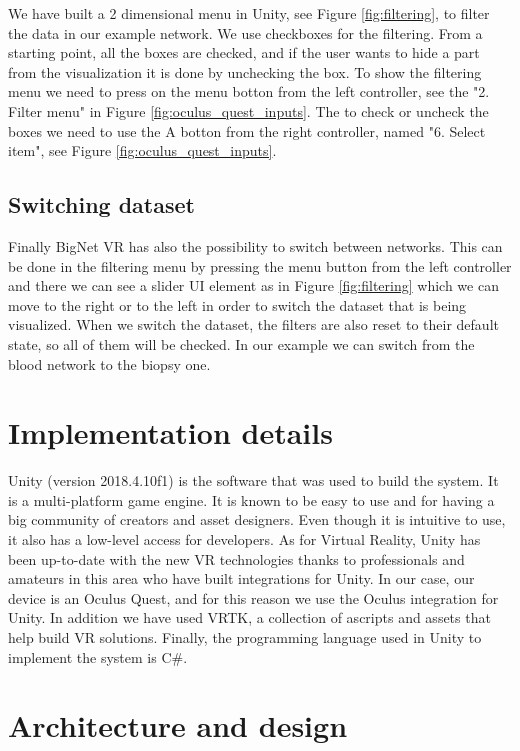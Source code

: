 We have built a 2 dimensional menu in Unity, see Figure \ref{fig:filtering}, to filter the data in our example network. We use checkboxes for the filtering. From a starting point, all the boxes are checked, and if the user wants to hide a part from the visualization it is done by unchecking the box. To show the filtering menu we need to press on the menu botton from the left controller, see the "2. Filter menu" in Figure \ref{fig:oculus_quest_inputs}. The to check or uncheck the boxes we need to use the A botton from the right controller, named "6. Select item", see Figure \ref{fig:oculus_quest_inputs}.

\subsection{Switching dataset}
Finally BigNet VR has also the possibility to switch between networks. This can be done in the filtering menu by pressing the menu button from the left controller and there we can see a slider UI element as in Figure \ref{fig:filtering} which we can move to the right or to the left in order to switch the dataset that is being visualized. When we switch the dataset, the filters are also reset to their default state, so all of them will be checked. In our example we can switch from the blood network to the biopsy one.

\section{Implementation details}
Unity (version 2018.4.10f1\cite{unity2018}) is the software that was used to build the system. It is a multi-platform game engine. It is known to be easy to use and for having a big community of creators and asset designers\cite{developing_vr_unity}. Even though it is intuitive to use, it also has a low-level access for developers. As for Virtual Reality, Unity has been up-to-date with the new VR technologies thanks to professionals and amateurs in this area who have built integrations for Unity. In our case, our device is an Oculus Quest, and for this reason we use the Oculus integration for Unity\cite{oculus_unity_integration}. In addition we have used VRTK, a collection of ascripts and assets that help build VR solutions\cite{vrtk_what}. Finally, the programming language used in Unity to implement the system is C\#.

\section{Architecture and design}

